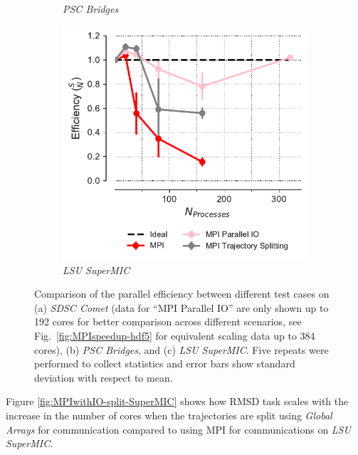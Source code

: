 \begin{figure}[!htb]
\begin{subfigure}{.35\textwidth}
    \caption{\emph{PSC Bridges}}
    \label{fig:comparison_efficiency_Bridges}
  \end{subfigure}
  \hfill
  \begin{subfigure}{.3\textwidth}
    \includegraphics[width=\linewidth]{figures/Comparison_Efficiency_all_SuperMIC.pdf}
    \caption{\emph{LSU SuperMIC}}
    \label{fig:comparison_efficiency_SuperMIC}
  \end{subfigure}
  \caption{Comparison of the parallel efficiency between different test cases on (a) \emph{SDSC Comet} (data for ``MPI Parallel IO'' are only shown up to 192 cores for better comparison across different scenarios, see Fig.~\protect\ref{fig:MPIspeedup-hdf5} for equivalent scaling data up to 384 cores), (b) \emph{PSC Bridges}, and (c) \emph{LSU SuperMIC}.
    Five repeats were performed to collect statistics and error bars show standard deviation with respect to mean.}
  \label{fig:comparison_efficiency_clusters}
\end{figure} 

Figure \ref{fig:MPIwithIO-split-SuperMIC} shows how RMSD task scales with the increase in the number of cores when the trajectories are split using \emph{Global Arrays} for communication compared to using MPI for communications on \emph{LSU SuperMIC}.  
 
